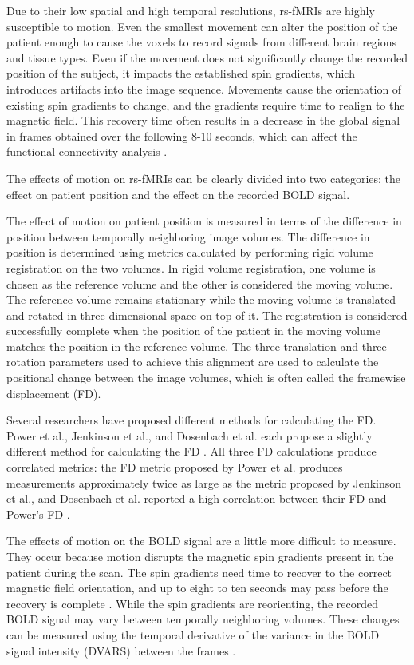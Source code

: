 Due to their low spatial and high temporal resolutions, rs-fMRIs are highly susceptible to motion. Even the smallest movement can alter the position of the patient enough to cause the voxels to record signals from different brain regions and tissue types. Even if the movement does not significantly change the recorded position of the subject, it impacts the established spin gradients, which introduces artifacts into the image sequence. Movements cause the orientation of existing spin gradients to change, and the gradients require time to realign to the magnetic field. This recovery time often results in a decrease in the global signal in frames obtained over the following 8-10 seconds, which can affect the functional connectivity analysis \cite{Power2014}.

The effects of motion on rs-fMRIs can be clearly divided into two categories: the effect on patient position and the effect on the recorded BOLD signal.

The effect of motion on patient position is measured in terms of the difference in position between temporally neighboring image volumes. The difference in position is determined using metrics calculated by performing rigid volume registration on the two volumes. 
In rigid volume registration, one volume is chosen as the reference volume and the other is considered the moving volume. The reference volume remains stationary while the moving volume is translated and rotated in three-dimensional space on top of it. The registration is considered successfully complete when the position of the patient in the moving volume matches the position in the reference volume. The three translation and three rotation parameters used to achieve this alignment are used to calculate the positional change between the image volumes, which is often called the framewise displacement (FD). 

Several researchers have proposed different methods for calculating the FD. Power et al., Jenkinson et al., and Dosenbach et al. each propose a slightly different method for calculating the FD \cite{Power2012} \cite{Jenkinson2002} \cite{Dosenbach2017}. All three FD calculations produce correlated metrics: the FD metric proposed by Power et al. produces measurements approximately twice as large as the metric proposed by Jenkinson et al., and Dosenbach et al. reported a high correlation between their FD and Power’s FD \cite{Yan2013a} \cite{Dosenbach2017}. 

The effects of motion on the BOLD signal are a little more difficult to measure. They occur because motion disrupts the magnetic spin gradients present in the patient during the scan. The spin gradients need time to recover to the correct magnetic field orientation, and up to eight to ten seconds may pass before the recovery is complete \cite{Power2014}. While the spin gradients are reorienting, the recorded BOLD signal may vary between temporally neighboring volumes. These changes can be measured using the temporal derivative of the variance in the BOLD signal intensity (DVARS) between the  frames \cite{Power2012}.

